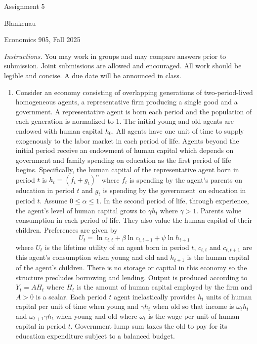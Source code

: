 \documentclass[12pt]{article}
\begin{document}
\begin{center}
{\LARGE Assignment 5}
\end{center}

\noindent Blankenau

\noindent Economics 905, Fall 2025

\noindent \textit{Instructions.} You may work in groups and may compare
answers prior to submission. Joint submissions are allowed and encouraged.
All work should be legible and concise. A due date will be announced in
class.\medskip 

\begin{enumerate}
\item Consider an economy consisting of overlapping generations of
two-period-lived homogeneous agents, a representative firm producing a
single good and a government. A representative agent is born each period and
the population of each generation is normalized to 1. The initial young and
old agents are endowed with human capital $h_{0}.$ All agents have one unit
of time to supply exogenously to the labor market in each period of life.
Agents beyond the initial period receive an endowment of human capital which
depends on government and family spending on education as the first period
of life begins. Specifically, the human capital of the representative agent
born in period $t$ is $h_{t}=\left( f_{t}+g_{t}\right) ^{\alpha }$ where $%
f_{t}$ is spending by the agent's parents on education in period $t$ and $%
g_{t}$ is spending by the government\ on education in period $t$. Assume $%
0\leq \alpha \leq 1.$ In the second period of life, through experience, the
agent's level of human capital grows to $\gamma h_{t}$ where $\gamma >1.$
Parents value consumption in each period of life. They also value the human
capital of their children. Preferences are given by 
\begin{equation*}
U_{t}=\ln c_{t,t}+\beta \ln c_{t,t+1}+\psi \ln h_{t+1}
\end{equation*}%
where $U_{t}$ is the lifetime utility of an agent born in period $t$, $%
c_{t,t}$ and $c_{t,t+1}$ are this agent's consumption when young and old and 
$h_{t+1}$ is the human capital of the agent's children. There is no storage
or capital in this economy so the structure precludes borrowing and lending.
Output is produced according to $Y_{t}=AH_{t}$ where $H_{t}$ is the amount
of human capital employed by the firm and $A>0$ is a scalar. Each period $t$
agent inelastically provides $h_{t}$ units of human capital per unit of time
when young and $\gamma h_{t}$ when old so that income is $\omega _{t}h_{t}$
and $\omega _{t+1}\gamma h_{t}$ when young and old where $\omega _{t}$ is
the wage per unit of human capital in period $t$. Government lump sum taxes
the old to pay for its education expenditure subject to a balanced budget.


\end{enumerate}
\end{document}
